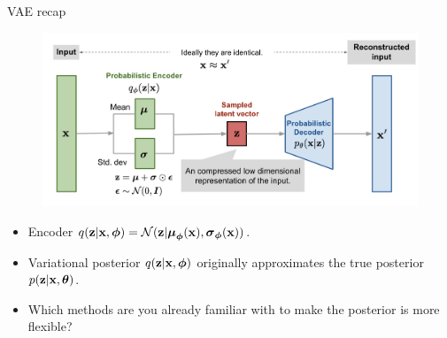 \begin{frame}{VAE recap}
	\vspace{-0.3cm}
	\begin{figure}[h]
		\centering
		\includegraphics[width=\linewidth]{figs/vae-gaussian.png}
	\end{figure}
	\vspace{-0.5cm}
	\begin{itemize}
		\item Encoder $q(\mathbf{z} | \mathbf{x}, \boldsymbol{\phi}) = \mathcal{N}(\mathbf{z} | \boldsymbol{\mu}_{\boldsymbol{\phi}}(\mathbf{x}), \boldsymbol{\sigma}_{\boldsymbol{\phi}}(\mathbf{x}))$.
		\item Variational posterior $q(\mathbf{z} | \mathbf{x}, \boldsymbol{\phi})$ originally approximates the true posterior $p(\mathbf{z} | \mathbf{x}, \boldsymbol{\theta})$.
		\item Which methods are you already familiar with to make the posterior is more flexible?
	\end{itemize}
\end{frame}
